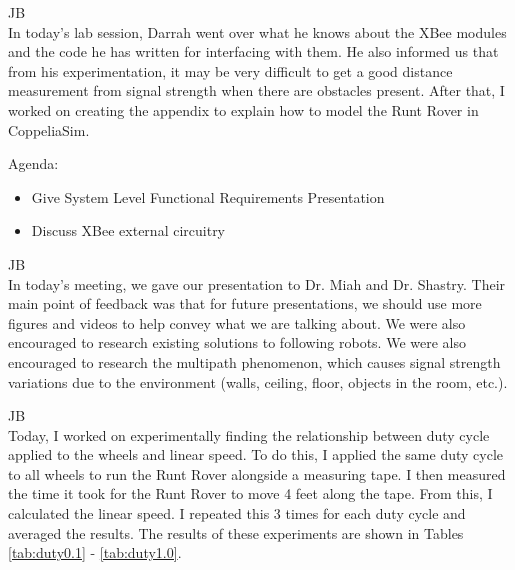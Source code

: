 \documentclass[fontsize=11pt, %
                             paper=letter, %
                             openany, %
                             captions=tableheading,
                             index=totoc,
                             hyperref]{labbook}
\begin{document}
\begin{addmargin}[0cm]{0cm}


JB\\
In today's lab session, Darrah went over what he knows about the XBee modules and the code he has written for interfacing with them. He also informed us that from his experimentation, it may be very difficult to get a good distance measurement from signal strength when there are obstacles present. After that, I worked on creating the appendix to explain how to model the Runt Rover in CoppeliaSim.

Agenda:
\begin{itemize}
    \item Give System Level Functional Requirements Presentation
    \item Discuss XBee external circuitry
\end{itemize}

JB\\
In today's meeting, we gave our presentation to Dr. Miah and Dr. Shastry. Their main point of feedback was that for future presentations, we should use more figures and videos to help convey what we are talking about. We were also encouraged to research existing solutions to following robots. We were also encouraged to research the multipath phenomenon, which causes signal strength variations due to the environment (walls, ceiling, floor, objects in the room, etc.).



JB\\
Today, I worked on experimentally finding the relationship between duty cycle applied to the wheels and linear speed. To do this, I applied the same duty cycle to all wheels to run the Runt Rover alongside a measuring tape. I then measured the time it took for the Runt Rover to move 4 feet along the tape. From this, I calculated the linear speed. I repeated this 3 times for each duty cycle and averaged the results. The results of these experiments are shown in Tables \ref{tab:duty0.1} - \ref{tab:duty1.0}.


\end{addmargin}
\end{document}
